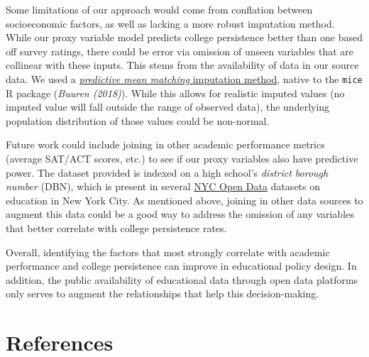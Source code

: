 \documentclass[
  man,floatsintext]{apa6}
\begin{document}
Some limitations of our approach would come from conflation between socioeconomic factors, as well as lacking a more robust imputation method. While our proxy variable model predicts college persistence better than one based off survey ratings, there could be error via omission of unseen variables that are collinear with these inputs. This stems from the availability of data in our source data. We used a \href{https://stefvanbuuren.name/fimd/sec-pmm.html}{\emph{predictive mean matching} imputation method}, native to the \texttt{mice} R package (\emph{Buuren (2018)}). While this allows for realistic imputed values (no imputed value will fall outside the range of observed data), the underlying population distribution of those values could be non-normal.

Future work could include joining in other academic performance metrics (average SAT/ACT scores, etc.) to see if our proxy variables also have predictive power. The dataset provided is indexed on a high school's \emph{district borough number} (DBN), which is present in several \href{https://opendata.cityofnewyork.us}{NYC Open Data} datasets on education in New York City. As mentioned above, joining in other data sources to augment this data could be a good way to address the omission of any variables that better correlate with college persistence rates.

Overall, identifying the factors that most strongly correlate with academic performance and college persistence can improve in educational policy design. In addition, the public availability of educational data through open data platforms only serves to augment the relationships that help this decision-making.

\newpage

\hypertarget{references}{%
\section{References}\label{references}}
\end{document}
